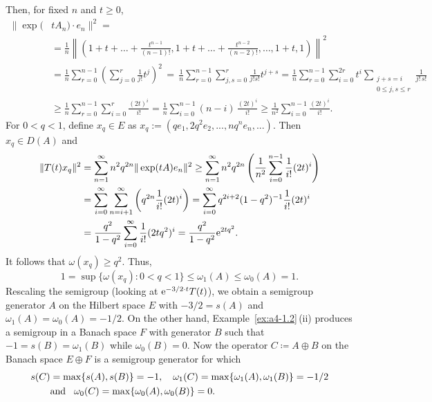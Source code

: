 \begin{example}
Then, for fixed $n$ and $t \geq 0$, 
\begin{align*}
	\|\exp(&t A_n) \cdot e_n\|^2 = \\
	&= \frac{1}{n} \left\| (1 + t + \dots + \frac{t^{n-1}}{(n-1)!}, 1 + t + \dots + \frac{t^{n-2}}{(n-2)!}, \dots, 1+t, 1) \right\|^2 \\
	&=
	\frac{1}{n} \sum_{r=0}^{n-1} \left(\sum_{j=0}^{r} \frac{1}{j!} t^j \right)^2 
	\, = \, \frac{1}{n} \sum_{r=0}^{n-1} \sum_{j,s=0}^{r} \frac{1}{j!s!} t^{j+s} 
	= \frac{1}{n} \sum_{r=0}^{n-1} \sum_{i=0}^{2r} t^i
	\sum_{\substack{j+s=i\\0 \leq j,s \leq r}} \frac{1}{j!\,s!} \\
	& \geq \frac{1}{n} \sum_{r=0}^{n-1} \sum_{i=0}^{r} \frac{(2t)^i}{i!} 
	= \frac{1}{n} \sum_{i=0}^{n-1} (n-i)\,\frac{(2t)^i}{i!} 
	 \geq \frac{1}{n^2} \sum_{i=0}^{n-1} \frac{(2t)^i}{i!}.
\end{align*}
For $ 0 < q < 1 $, define $ x_q \in E $ as  
$
x_q :=  (q e_1, 2q^2 e_2, ..., n q^n e_n, ...).
$
Then $x_q \in D(A)$ and
\begin{align*}
	\|T(t)x_q\|^2 & = \sum_{n=1}^{\infty} n^2 q^{2n} \| \exp(t A) e_n \|^2
	\geq \sum_{n=1}^{\infty} n^2 q^{2n} \left(\frac{1}{n^2} \sum_{i=0}^{n-1}  \frac{1}{i!} (2t)^i \right)\\
	&= \sum_{i=0}^{\infty} \sum_{n=i+1}^{\infty} \left( q^{2n} \frac{1}{i!} (2t)^i \right)
	= \sum_{i=0}^{\infty} q^{2i+2} (1 - q^2)^{-1} \frac{1}{i!} (2t)^i \\
	&= \frac{q^2}{1 - q^2} \sum_{i=0}^{\infty} \frac{1}{i!} (2t q^2)^i
	= \frac{q^2}{1 - q^2} \eu^{2t q^2}.
\end{align*}
It follows that $\omega(x_q) \geq q^2$. 
Thus,
\[
1 = \sup \{\omega(x_q)\colon0 < q < 1\} \leq \omega_1(A) \leq \omega_{0}(A) = 1.
\]
Rescaling the semigroup (\ie looking at $\mathrm{e}^{-3/2 \cdot t} T(t)$), we obtain a semigroup generator $A$ on the Hilbert space $E$ with $-3/2 = s(A)$ and $\omega_1(A) = \omega_{0}(A) = -1/2$. 
On the other hand, Example~\ref{ex:a4-1.2}\,(ii) produces a semigroup in a Banach space $F$ with generator $B$ such that $-1 = s(B) = \omega_1(B)$ while $\omega_{0}(B) = 0$. 
Now the operator $C \coloneq  A \oplus B$ on the Banach space $E \oplus F$ is a semigroup generator for which
\begin{align*}
s(C) &= \max \{s(A), s(B)\} = -1, \quad \omega_1(C) = \max\{\omega_1(A), \omega_1(B)\} = -1/2 \\
& \text{and \phantom{x}} \omega_{0}(C) = \max\{\omega_{0}(A), \omega_{0}(B)\} = 0.
\end{align*}
\end{example}
